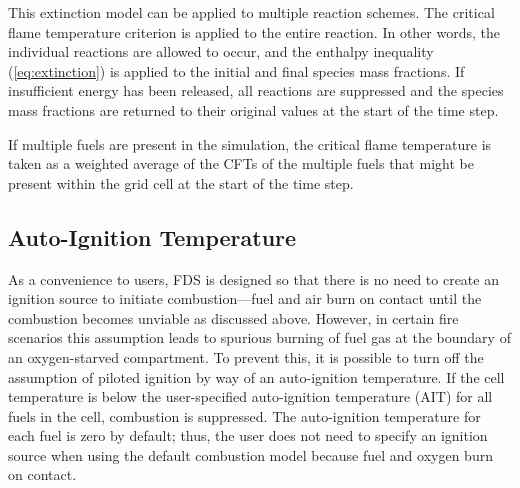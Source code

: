 This extinction model can be applied to multiple reaction schemes. The critical flame temperature criterion is applied to the entire reaction. In other words, the individual reactions are allowed to occur, and the enthalpy inequality (\ref{eq:extinction}) is applied to the initial and final species mass fractions. If insufficient energy has been released, all reactions are suppressed and the species mass fractions are returned to their original values at the start of the time step.

If multiple fuels are present in the simulation, the critical flame temperature is taken as a weighted average of the CFTs of the multiple fuels that might be present within the grid cell at the start of the time step.


\subsection{Auto-Ignition Temperature}

As a convenience to users, FDS is designed so that there is no need to create an ignition source to initiate combustion---fuel and air burn on contact until the combustion becomes unviable as discussed above. However, in certain fire scenarios this assumption leads to spurious burning of fuel gas at the boundary of an oxygen-starved compartment. To prevent this, it is possible to turn off the assumption of piloted ignition by way of an auto-ignition temperature. If the cell temperature is below the user-specified auto-ignition temperature (AIT) for all fuels in the cell, combustion is suppressed. The auto-ignition temperature for each fuel is zero by default; thus, the user does not need to specify an ignition source when using the default combustion model because fuel and oxygen burn on contact.
